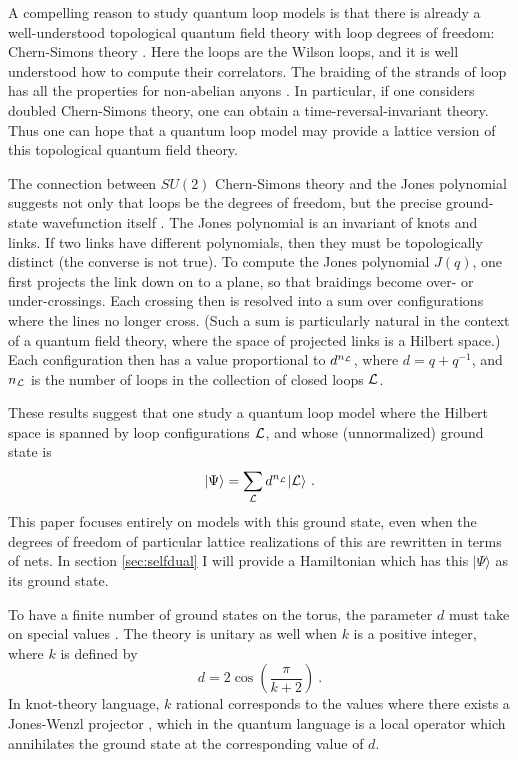 \documentclass[11pt]{article}
\begin{document}
A compelling reason
to study quantum loop models is that there is already a
well-understood topological quantum field theory with loop degrees of
freedom: 
Chern-Simons theory \cite{Witten}. Here the loops are the Wilson
loops, and it is well understood how to compute their
correlators. The braiding of the strands of loop has all the 
properties for non-abelian anyons \cite{FNSWW}. In particular, if one
considers doubled Chern-Simons theory, one can obtain a
time-reversal-invariant theory. Thus one can hope that a quantum loop
model may provide a lattice version of this topological quantum field
theory. 

The connection between $SU(2)$ Chern-Simons theory and the Jones
polynomial \cite{Jones,Witten} suggests not only that loops be the
degrees of freedom, but the precise ground-state wavefunction itself
\cite{Freedman01}.  The Jones polynomial is an invariant of knots and
links. If two links have different polynomials, then they must be
topologically distinct (the converse is not true). To compute the
Jones polynomial $J(q)$, one first projects the link down on to a
plane, so that braidings become over- or under-crossings.  Each
crossing then is resolved into a sum over configurations where the
lines no longer cross. (Such a sum is particularly natural in the
context of a quantum field theory, where the space of projected links
is a Hilbert space.) Each configuration then has a value proportional
to $d^{n_{\cal L}}$, where $d=q+q^{-1}$, and $n_{\cal L}$ is the
number of loops in the collection of closed loops ${\cal L}$.

These results suggest that one study a quantum loop model where the
Hilbert space is spanned by loop configurations ${\cal L}$, and whose 
(unnormalized) ground state is
\begin{equation}
|\Psi\rangle = \sum_{\cal L} d^{n^{}_{\cal L}} |{\cal L}\rangle\ .
\label{gsw}
\end{equation}
This paper focuses entirely on models with this ground
state, even when the degrees of freedom of particular lattice realizations of
this are rewritten in terms of nets. In section \ref{sec:selfdual} I
will provide a Hamiltonian which has this $|\Psi\rangle$ as its ground
state. 

To have a finite number of ground states on the
torus, the parameter $d$ must take on special values \cite{Freedman01}.
The theory is unitary as well when $k$ is a positive integer, where
$k$ is defined by
\begin{equation}
d=2\cos\left(\frac{\pi}{k+2}\right)\ .
\label{ddef}
\end{equation}
In knot-theory language, $k$ rational corresponds to the values where
there exists a Jones-Wenzl projector \cite{Jones,JW}, which in the
quantum language is a local operator which annihilates the ground
state at the corresponding value of $d$. 
\end{document}
